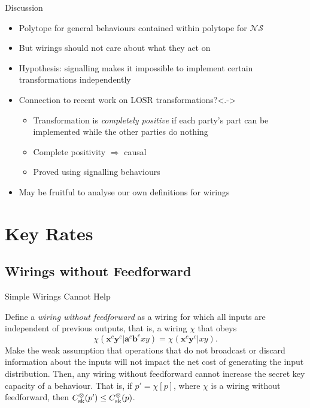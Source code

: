 \documentclass[xcolor=dvipsnames]{beamer}
\newcommand{\?}{\mathrel{?}} %
\newcommand{\cvec}[1]{\boldsymbol{\mathbf{#1}}}    %
\newcommand{\NSs}{\mathcal{NS}}
\newcommand{\sk}{\rm sk}
\begin{document}
\begin{frame}{Discussion}
  \begin{itemize}[<+->]
    \item Polytope for general behaviours contained within polytope for \(\NSs\)
    \item But wirings should not care about what they act on
    \item Hypothesis: signalling makes it impossible to implement certain transformations independently
    \item Connection to recent work on LOSR transformations?\only<.->{}
      \begin{itemize}
        \item Transformation is \emph{completely positive} if each party's part can be implemented while the other parties do nothing
        \item Complete positivity \(\Rightarrow\) causal
        \item Proved using signalling behaviours
      \end{itemize}
    \item May be fruitful to analyse our own definitions for wirings
  \end{itemize}
\end{frame}


\section{Key Rates}

\subsection{Wirings without Feedforward}

\begin{frame}{Simple Wirings Cannot Help}
  \begin{lemma}
    Define a \emph{wiring without feedforward} as a wiring for which all inputs are independent of previous outputs, that is, a wiring \(\chi\) that obeys
    \[
      \chi(\cvec{x}^c\cvec{y}^c|\cvec{a}^c\cvec{b}^cxy) = \chi(\cvec{x}^c\cvec{y}^c|xy).
    \]
    Make the weak assumption that operations that do not broadcast or discard information about the inputs will not impact the net cost of generating the input distribution. Then, any wiring without feedforward cannot increase the secret key capacity of a behaviour. That is, if \(p' = \chi[p]\), where \(\chi\) is a wiring without feedforward, then \(C_{\sk}^{\otimes}(p') \leq C_{\sk}^{\otimes}(p)\).
  \end{lemma}
\end{frame}
\end{document}
